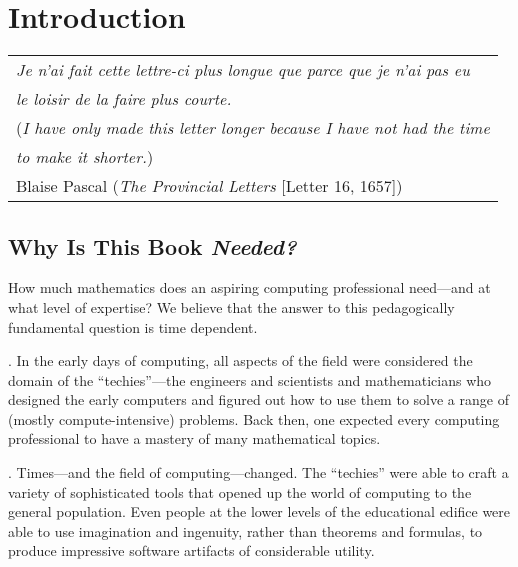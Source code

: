 
\chapter{Introduction}
\label{ch:intro}

\hfill
\begin{tabular}{l}
{\em Je n'ai fait cette lettre-ci plus longue que parce que je n'ai pas eu} \\
\hspace*{.25in}
{\em le loisir de la faire plus courte.}  \\
({\em I have only made this letter longer because I have not had the time} \\
\hspace*{.25in}
{\em to make it shorter.}) \\
\hfill{\small Blaise Pascal ({\it The Provincial Letters} [Letter 16, 1657])}
\end{tabular}


\vspace*{.5in}

\section{Why Is This Book {\em Needed?}}
\label{sec:bookneeded}

How much mathematics does an aspiring computing professional need---and at what level of expertise?  We believe that the answer to this pedagogically fundamental question is time dependent.

\medskip

.
In the early days of computing, all aspects of the field were considered the domain of the ``techies''---the engineers and scientists and mathematicians who designed the early computers and figured out how to use them to solve a range of (mostly compute-intensive) problems.  Back then, one expected every computing professional to have a mastery of many mathematical topics.

\medskip

.
Times---and the field of computing---changed.  The ``techies'' were able to craft a variety of sophisticated tools that opened up the world of computing to the general population.  Even people at the lower levels of the educational edifice were able to use imagination and ingenuity, rather than theorems and formulas, to produce impressive software artifacts of considerable utility.

